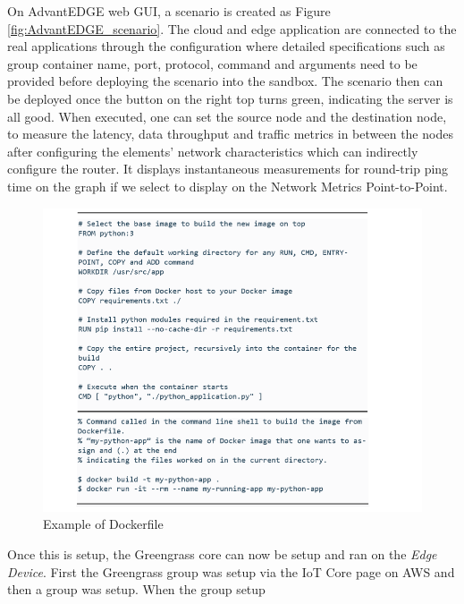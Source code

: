 On AdvantEDGE web GUI, a scenario is created as Figure \ref{fig:AdvantEDGE_scenario}.
The cloud and edge application are connected to the real applications through the configuration where detailed specifications such as group container name, port, protocol, command and arguments need to be provided before deploying the scenario into the sandbox. The scenario then can be deployed once the button on the right top turns green, indicating the server is all good. When executed, one can set the source node and the destination node, to measure the latency, data throughput and traffic metrics in between the nodes after configuring the elements’ network characteristics which can indirectly configure the router. It displays instantaneous measurements for round-trip ping time on the graph if we select to display on the Network Metrics Point-to-Point.

\begin{figure}[ht]
    \caption{Example of Dockerfile}
    \centering
    \includegraphics[width=1\linewidth]{pages/Chapter4/Chapter 4 Images/Dockerfile.PNG}
\end{figure}

Once this is setup, the Greengrass core can now be setup and ran on the \textit{Edge Device}. First the Greengrass group was setup via the IoT Core page on AWS and then a group was setup. When the group setup 

